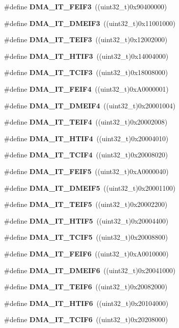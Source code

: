\begin{DoxyCompactItemize}
\#define \textbf{ D\+M\+A\+\_\+\+I\+T\+\_\+\+F\+E\+I\+F3}~((uint32\+\_\+t)0x90400000)
\item 
\#define \textbf{ D\+M\+A\+\_\+\+I\+T\+\_\+\+D\+M\+E\+I\+F3}~((uint32\+\_\+t)0x11001000)
\item 
\#define \textbf{ D\+M\+A\+\_\+\+I\+T\+\_\+\+T\+E\+I\+F3}~((uint32\+\_\+t)0x12002000)
\item 
\#define \textbf{ D\+M\+A\+\_\+\+I\+T\+\_\+\+H\+T\+I\+F3}~((uint32\+\_\+t)0x14004000)
\item 
\#define \textbf{ D\+M\+A\+\_\+\+I\+T\+\_\+\+T\+C\+I\+F3}~((uint32\+\_\+t)0x18008000)
\item 
\#define \textbf{ D\+M\+A\+\_\+\+I\+T\+\_\+\+F\+E\+I\+F4}~((uint32\+\_\+t)0x\+A0000001)
\item 
\#define \textbf{ D\+M\+A\+\_\+\+I\+T\+\_\+\+D\+M\+E\+I\+F4}~((uint32\+\_\+t)0x20001004)
\item 
\#define \textbf{ D\+M\+A\+\_\+\+I\+T\+\_\+\+T\+E\+I\+F4}~((uint32\+\_\+t)0x20002008)
\item 
\#define \textbf{ D\+M\+A\+\_\+\+I\+T\+\_\+\+H\+T\+I\+F4}~((uint32\+\_\+t)0x20004010)
\item 
\#define \textbf{ D\+M\+A\+\_\+\+I\+T\+\_\+\+T\+C\+I\+F4}~((uint32\+\_\+t)0x20008020)
\item 
\#define \textbf{ D\+M\+A\+\_\+\+I\+T\+\_\+\+F\+E\+I\+F5}~((uint32\+\_\+t)0x\+A0000040)
\item 
\#define \textbf{ D\+M\+A\+\_\+\+I\+T\+\_\+\+D\+M\+E\+I\+F5}~((uint32\+\_\+t)0x20001100)
\item 
\#define \textbf{ D\+M\+A\+\_\+\+I\+T\+\_\+\+T\+E\+I\+F5}~((uint32\+\_\+t)0x20002200)
\item 
\#define \textbf{ D\+M\+A\+\_\+\+I\+T\+\_\+\+H\+T\+I\+F5}~((uint32\+\_\+t)0x20004400)
\item 
\#define \textbf{ D\+M\+A\+\_\+\+I\+T\+\_\+\+T\+C\+I\+F5}~((uint32\+\_\+t)0x20008800)
\item 
\#define \textbf{ D\+M\+A\+\_\+\+I\+T\+\_\+\+F\+E\+I\+F6}~((uint32\+\_\+t)0x\+A0010000)
\item 
\#define \textbf{ D\+M\+A\+\_\+\+I\+T\+\_\+\+D\+M\+E\+I\+F6}~((uint32\+\_\+t)0x20041000)
\item 
\#define \textbf{ D\+M\+A\+\_\+\+I\+T\+\_\+\+T\+E\+I\+F6}~((uint32\+\_\+t)0x20082000)
\item 
\#define \textbf{ D\+M\+A\+\_\+\+I\+T\+\_\+\+H\+T\+I\+F6}~((uint32\+\_\+t)0x20104000)
\item 
\#define \textbf{ D\+M\+A\+\_\+\+I\+T\+\_\+\+T\+C\+I\+F6}~((uint32\+\_\+t)0x20208000)

\end{DoxyCompactItemize}
